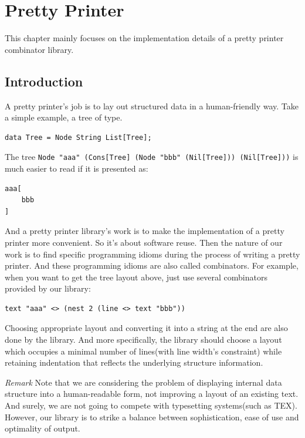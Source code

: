 \chapter{Pretty Printer}
This chapter mainly focuses on the implementation details of a pretty printer combinator library.

\section{Introduction}

A pretty printer's job is to lay out structured data in a human-friendly way. Take a simple example, a tree of type.

\begin{lstlisting}
data Tree = Node String List[Tree];
\end{lstlisting}

The tree \texttt{Node "aaa" (Cons[Tree] (Node "bbb" (Nil[Tree])) (Nil[Tree]))} is much easier to read if it is presented as:

\begin{lstlisting}
aaa[
    bbb
]
\end{lstlisting}

And a pretty printer library's work is to make the implementation of a pretty printer more convenient. So it's about software reuse. Then the nature of our work is to find specific programming idioms during the process of writing a pretty printer. And these programming idioms are also called combinators. For example, when you want to get the tree layout above, just use several combinators provided by our library:

\begin{lstlisting}
text "aaa" <> (nest 2 (line <> text "bbb"))
\end{lstlisting}

Choosing appropriate layout and converting it into a string at the end are also done by the library. And more specifically, the library should choose a layout which occupies a minimal number of lines(with line width's constraint) while retaining indentation that reflects the underlying structure information.

\emph{Remark}
Note that we are considering the problem of displaying internal data structure into a human-readable form, not improving a layout of an existing text. And surely, we are not going to compete with typesetting systems(such as TEX). However, our library is to strike a balance between sophistication, ease of use and optimality of output.


